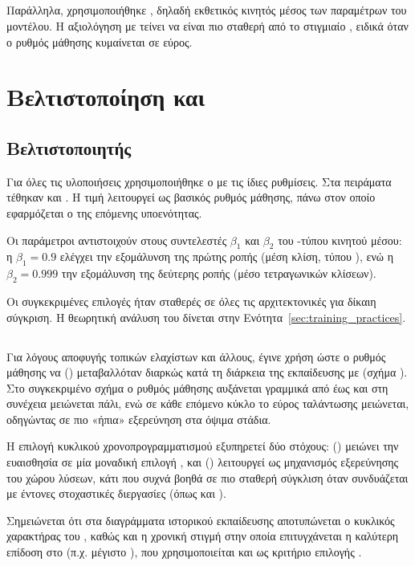 \subsection{}
Παράλληλα, χρησιμοποιήθηκε , δηλαδή εκθετικός κινητός μέσος
των παραμέτρων του μοντέλου. Η αξιολόγηση με  τείνει να είναι πιο
σταθερή από το στιγμιαίο , ειδικά όταν ο ρυθμός μάθησης κυμαίνεται σε εύρος.

\section{Βελτιστοποίηση και }
\label{sec:proto_optim}

\subsection{Βελτιστοποιητής}
Για όλες τις υλοποιήσεις χρησιμοποιήθηκε ο  με τις ίδιες ρυθμίσεις. Στα πειράματα τέθηκαν  και
. Η τιμή  λειτουργεί ως
βασικός ρυθμός μάθησης, πάνω στον οποίο εφαρμόζεται ο 
της επόμενης υποενότητας.

Οι παράμετροι  αντιστοιχούν στους συντελεστές
$\beta_1$ και $\beta_2$ του -τύπου κινητού μέσου: η
$\beta_1=0.9$ ελέγχει την εξομάλυνση της πρώτης ροπής (μέση κλίση, τύπου
), ενώ η $\beta_2=0.999$ την εξομάλυνση της δεύτερης ροπής
(μέσο τετραγωνικών κλίσεων). 

Οι συγκεκριμένες επιλογές ήταν σταθερές σε όλες
τις αρχιτεκτονικές για δίκαιη σύγκριση. Η θεωρητική ανάλυση του
 δίνεται στην Ενότητα~\ref{sec:training_practices}.

\subsection{ }
Για λόγους αποφυγής τοπικών ελαχίστων και άλλους, 
έγινε χρήση  ώστε ο ρυθμός μάθησης να () μεταβαλλόταν 
διαρκώς κατά τη διάρκεια της
εκπαίδευσης με  \cite{smith2017cyclical} (σχήμα ).
Στο συγκεκριμένο σχήμα ο ρυθμός μάθησης αυξάνεται γραμμικά από
 έως  και στη συνέχεια μειώνεται πάλι, ενώ σε κάθε
επόμενο κύκλο το εύρος ταλάντωσης μειώνεται, οδηγώντας σε πιο «ήπια» εξερεύνηση στα
όψιμα στάδια. 

Η επιλογή κυκλικού χρονοπρογραμματισμού εξυπηρετεί δύο στόχους:
() μειώνει την ευαισθησία σε μία μοναδική επιλογή , και
() λειτουργεί ως μηχανισμός εξερεύ\-νησης του χώρου λύσεων, κάτι που συχνά βοηθά
σε πιο σταθερή σύγκλιση όταν συνδυάζεται με έντονες στοχαστικές διεργασίες
(όπως  και ).

Σημειώνεται ότι στα διαγράμματα ιστορικού εκπαίδευσης αποτυπώνεται ο κυκλικός
χαρακτήρας του , καθώς και η χρονική στιγμή στην οποία επιτυγχάνεται η
καλύτερη επί\-δοση στο  (π.χ. μέγιστο ), που χρησιμοποιείται
και ως κριτήριο επιλογής .


\clearpage
